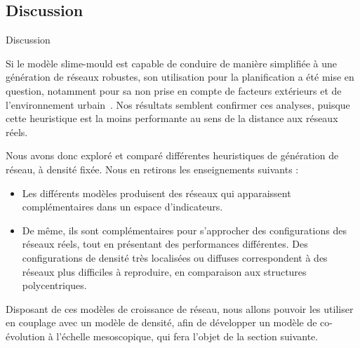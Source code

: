 %



%
%
%
%


\subsection{Discussion}{Discussion}



Si le modèle slime-mould est capable de conduire de manière simplifiée à une génération de réseaux robustes, son utilisation pour la planification a été mise en question, notamment pour sa non prise en compte de facteurs extérieurs et de l'environnement urbain~\cite{adamatzky2010road}. Nos résultats semblent confirmer ces analyses, puisque cette heuristique est la moins performante au sens de la distance aux réseaux réels.


Nous avons donc exploré et comparé différentes heuristiques de génération de réseau, à densité fixée. Nous en retirons les enseignements suivants :
\begin{itemize}
	\item Les différents modèles produisent des réseaux qui apparaissent complémentaires dans un espace d'indicateurs.
	\item De même, ils sont complémentaires pour s'approcher des configurations des réseaux réels, tout en présentant des performances différentes. Des configurations de densité très localisées ou diffuses correspondent à des réseaux plus difficiles à reproduire, en comparaison aux structures polycentriques.
\end{itemize}


Disposant de ces modèles de croissance de réseau, nous allons pouvoir les utiliser en couplage avec un modèle de densité, afin de développer un modèle de co-évolution à l'échelle mesoscopique, qui fera l'objet de la section suivante.





\stars



